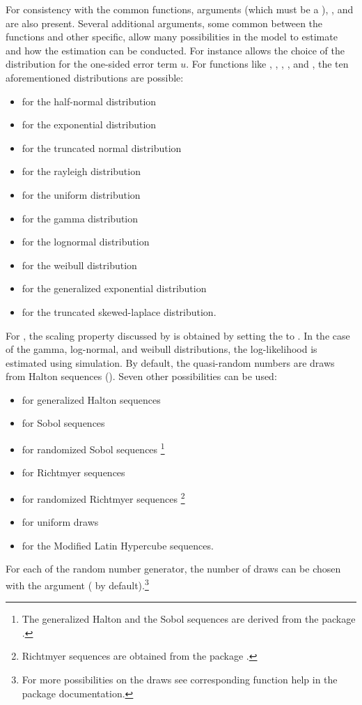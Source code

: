 \documentclass[nojss]{jss}
\begin{document}
For consistency with the common  functions, arguments  (which 
must be a ), , and  are also 
present. Several additional arguments, some common between the functions and 
other specific, allow many possibilities in the model to estimate and how the 
estimation can be conducted. For instance  allows the choice of 
the distribution for the one-sided error term $u$. For functions like 
, , , , 
and , the ten aforementioned distributions are possible:
%
\begin{itemize} \itemsep 10pt
\item {} for the half-normal distribution
\item {} for the exponential distribution
\item {} for the truncated normal distribution
\item {} for the rayleigh distribution
\item {} for the uniform distribution
\item {} for the gamma distribution
\item {} for the lognormal distribution
\item {} for the weibull distribution
\item {} for the generalized exponential distribution
\item {} for the truncated skewed-laplace distribution.
\end{itemize}
%
For , the scaling property discussed by \cite{wang02} is obtained
by setting the  to . In the case of the gamma, 
log-normal, and weibull distributions, the log-likelihood is estimated using 
simulation. By default, the quasi-random numbers are draws from 
Halton sequences (). Seven other possibilities can be 
used:
%
\begin{itemize} \itemsep 10pt
\item {} for generalized Halton sequences
\item {} for Sobol sequences
\item {} for randomized Sobol sequences \footnote{The generalized
Halton and the Sobol sequences are derived from the  package \citep{qrng}.}
\item {} for Richtmyer sequences
\item {} for randomized Richtmyer sequences \footnote{Richtmyer sequences
are obtained from the  package \citep{mnorm}.}
\item {} for uniform draws 
\item {} for the Modified Latin Hypercube sequences.
\end{itemize}
%
For each of the random number generator, the number of draws can be chosen with
the argument  ( by default).\footnote{For more 
possibilities on the draws see corresponding function help in the package
documentation.}
\end{document}
